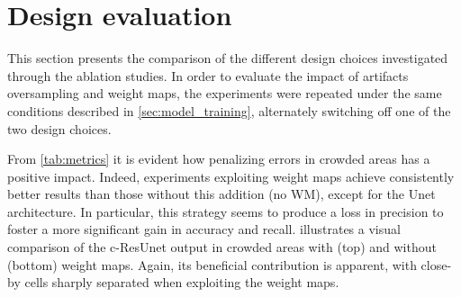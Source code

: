 \section{Design evaluation}

This section presents the comparison of the different design choices investigated through the ablation studies.
In order to evaluate the impact of artifacts oversampling and weight maps, the experiments were repeated under the same conditions described in \cref{sec:model_training}, alternately switching off one of the two design choices.

From \cref{tab:metrics} it is evident how penalizing errors in crowded areas has a positive impact. Indeed, experiments exploiting weight maps achieve consistently better results than those without this addition (no WM), except for the Unet architecture.  
In particular, this strategy seems to produce a loss in precision to foster a more significant gain in accuracy and recall.
 illustrates a visual comparison of the c-ResUnet output in crowded areas with (top) and without (bottom) weight maps. 
Again, its beneficial contribution is apparent, with close-by cells sharply separated when exploiting the weight maps.

